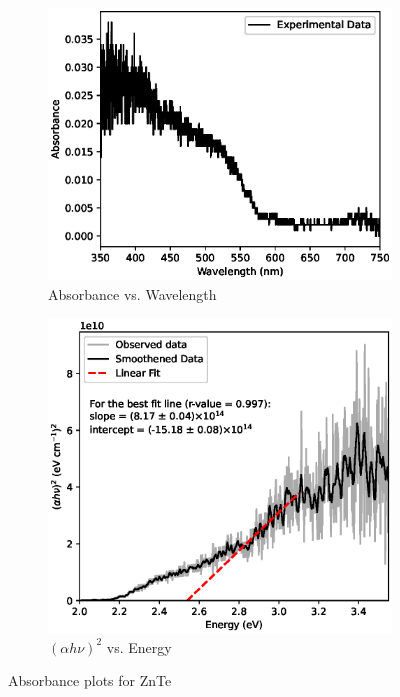 \begin{figure}
    \begin{subfigure}{\linewidth}
    \includegraphics[width=1\textwidth]{images/znoA.eps}
    \caption{Absorbance vs. Wavelength}
    \end{subfigure}
    
    \begin{subfigure}{\linewidth}
    \includegraphics[width=1\textwidth]{images/zno.eps}
    \caption{$(\alpha h \nu)^2$ vs. Energy}
    \label{znob}
    \end{subfigure}
    \caption{Absorbance plots for ZnTe}
    \label{zno}
\end{figure}

